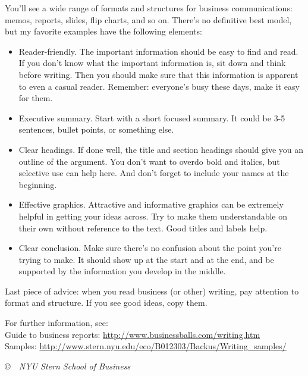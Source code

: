 \documentclass[letterpaper,12pt]{article}
\begin{document}
You'll see a wide range of formats and structures 
for business communications:
memos, reports, slides, flip charts, and so on.
There's no definitive best model,
but my favorite examples have the following elements:  
%
\begin{itemize}
\item Reader-friendly.  
The important information should be easy to find and read.  
If you don't know what the important information is, 
sit down and think before writing. 
Then you should make sure that this information is 
apparent to even a casual reader.
Remember:  everyone's busy these days, make it easy for them.  

\item Executive summary.  Start with a short focused summary.  
It could be 3-5 sentences, bullet points, or something else.  
    
\item Clear headings.  
If done well, the title and section headings should 
give you an outline of the argument.  
You don't want to overdo bold and italics, 
but selective use can help here.  
And don't forget to include your names at the beginning.  

\item Effective graphics.  Attractive and informative graphics 
can be extremely helpful in getting your ideas across.
Try to make them understandable
on their own without reference to the text.  
Good titles and labels help.  

\item Clear conclusion.  Make sure there's no confusion 
about the point you're trying to make.
It should show up at the start and at the end, 
and be supported by the information you develop in the middle. 

\end{itemize}
%
Last piece of advice:  when you read business (or other) writing, 
pay attention to format and structure.  
If you see good ideas, copy them.  

For further information, see:   \\ 
Guide to business reports:  \url{http://www.businessballs.com/writing.htm} \\
Samples:  \url{http://www.stern.nyu.edu/eco/B012303/Backus/Writing_samples/}


\vfill \centerline{\it \copyright \ \number\year \ NYU Stern
School of Business}

\end{document}
